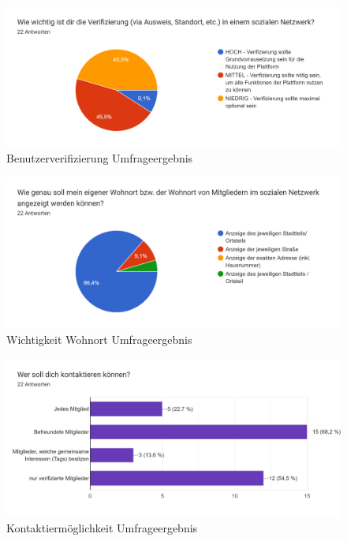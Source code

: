 \begin{figure}[!htb]
    \centering
    \includegraphics[width=1\textwidth]{figures/daniel/Bild-11.png}
    \caption[shortcaption]{Benutzerverifizierung Umfrageergebnis}
    \label{fig:bild11}
\end{figure}

\begin{figure}[!htb]
    \centering
    \includegraphics[width=1\textwidth]{figures/daniel/bild-12.png}
    \caption[shortcaption]{Wichtigkeit Wohnort Umfrageergebnis}
    \label{fig:bild12}
\end{figure}

\begin{figure}[!htb]
    \centering
    \includegraphics[width=1\textwidth]{figures/daniel/bild-13.png}
    \caption[shortcaption]{Kontaktiermöglichkeit Umfrageergebnis}
    \label{fig:bild13}
\end{figure}

